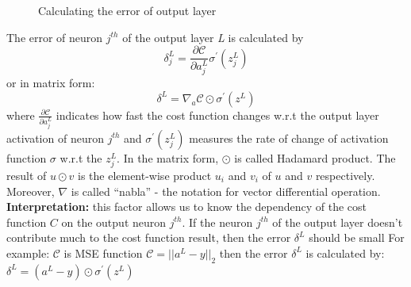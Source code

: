 \begin{figure}[H]
\centering
\caption{Calculating the error of output layer}
\end{figure}

The error of neuron \textit{$j^{th}$} of the output layer \textit{L} is calculated by
\begin{equation}
    \delta^{L}_{j} = \frac{\partial \mathcal{C}}{\partial a^{L}_{j}} \sigma^{'}(z^{L}_{j})
\end{equation}
or in matrix form:
\begin{equation}\label{eq:erroroutput}
    \delta^{L} = \nabla_{a} \mathcal{C}\odot \sigma^{'}(z^{L})
\end{equation}
where $\frac{\partial \mathcal{C}}{\partial a^{L}_{j}}$ indicates how fast the cost function changes w.r.t the output layer activation of neuron \textit{$j^{th}$}
and $\sigma^{'}(z^{L}_{j})$ measures the rate of change of activation function $\sigma$ w.r.t the $z^{L}_{j}$. In the matrix form, $\odot$ is called Hadamard product. The result of $u \odot v$ is the element-wise product $u_{i}$ and $v_{i}$ of $u$ and $v$ respectively. Moreover, $\nabla$ is called ``nabla'' - the notation for vector differential operation.\newline
\newline\noindent
\textbf{Interpretation:} this factor allows us to know the dependency of the cost function $C$ on the output neuron $j^{th}$. If the neuron $j^{th}$ of the output layer doesn't contribute much to the cost function result, then the error $\delta^{L}$ should be small\newline
\newline
For example: $\mathcal{C}$ is MSE function $\mathcal{C} = || a^{L} - y||_{2}$ then the error $\delta^{L}$ is calculated by: $\delta^{L} = (a^{L} - y) \odot \sigma^{'}(z^{L})$\newline

